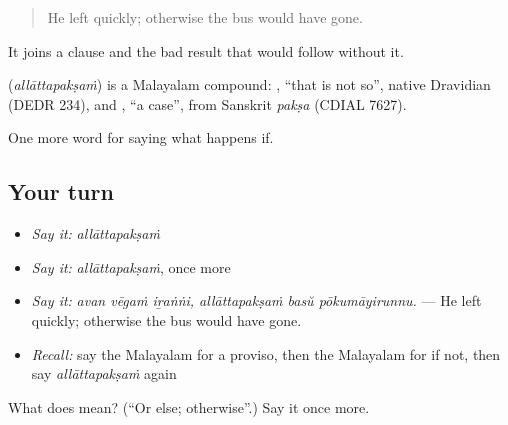 \begin{quote}
He left quickly; otherwise the bus would have gone.
\end{quote}

It joins a clause and the bad result that would follow without it.

\begin{cousinweb}
\textbf{} (\emph{allāttapakṣaṁ}) is a Malayalam compound: , \textquotedblleft{}that is not so\textquotedblright{}, native Dravidian (DEDR 234), and , \textquotedblleft{}a case\textquotedblright{}, from Sanskrit \emph{pakṣa} (CDIAL 7627).
\end{cousinweb}

\begin{grammarlens}[title={What you've built}]
One more word for saying what happens if.
\end{grammarlens}

\subsection*{Your turn}
\begin{itemize}
\raggedright
  \item \emph{Say it:} \emph{allāttapakṣaṁ}
  \item \emph{Say it:} \emph{allāttapakṣaṁ}, once more
  \item \emph{Say it:} \emph{avan vēgaṁ iṟaṅṅi, allāttapakṣaṁ basŭ pōkumāyirunnu.} — He left quickly; otherwise the bus would have gone.
  \item \emph{Recall:} say the Malayalam for a proviso, then the Malayalam for if not, then say \emph{allāttapakṣaṁ} again
\end{itemize}

\begin{tcolorbox}[breakable,colback=teal!4,colframe=teal!35!black,title={Before you move on}]
What does  mean? (\textquotedblleft{}Or else; otherwise\textquotedblright{}.) Say it once more.
\end{tcolorbox}
